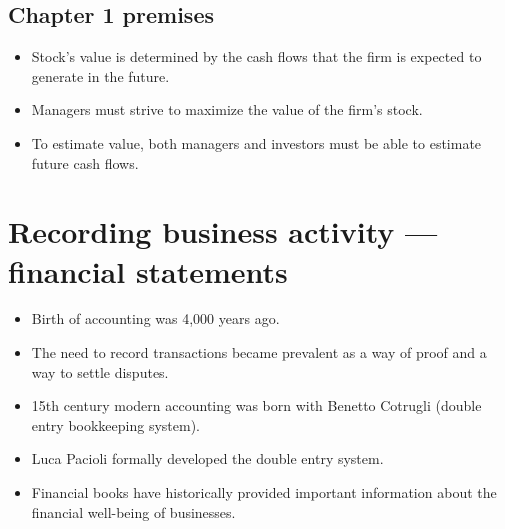\documentclass{article}
\begin{document}
\subsection{Chapter 1 premises}
\begin{itemize}
    \item Stock's value is determined by the cash flows that the firm is expected to generate in the future. 
    \item Managers must strive to maximize the value of the firm's stock. 
    \item To estimate value, both managers and investors must be able to estimate future cash flows.
\end{itemize}

\section{Recording business activity — financial statements}
\begin{itemize}
    \item Birth of accounting was 4,000 years ago. 
    \item The need to record transactions became prevalent as a way of proof and a way to settle disputes. 
    \item 15th century modern accounting was born with Benetto Cotrugli (double entry bookkeeping system).
    \item Luca Pacioli formally developed the double entry system.
    \item Financial books have historically provided important information about the financial well-being of businesses.
\end{itemize}
\end{document}
